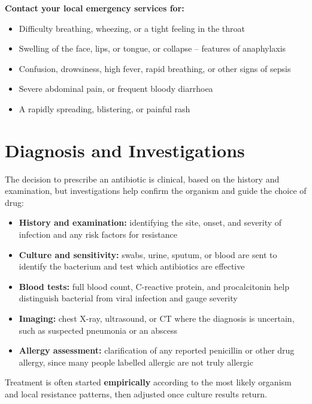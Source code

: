 \textbf{Contact your local emergency services for:}
\begin{itemize}
    \item Difficulty breathing, wheezing, or a tight feeling in the throat
    \item Swelling of the face, lips, or tongue, or collapse -- features of anaphylaxis
    \item Confusion, drowsiness, high fever, rapid breathing, or other signs of sepsis
    \item Severe abdominal pain, or frequent bloody diarrhoea
    \item A rapidly spreading, blistering, or painful rash
\end{itemize}

\section*{Diagnosis and Investigations}
The decision to prescribe an antibiotic is clinical, based on the history and examination, but investigations help confirm the organism and guide the choice of drug:

\begin{itemize}
    \item \textbf{History and examination:} identifying the site, onset, and severity of infection and any risk factors for resistance
    \item \textbf{Culture and sensitivity:} swabs, urine, sputum, or blood are sent to identify the bacterium and test which antibiotics are effective
    \item \textbf{Blood tests:} full blood count, C-reactive protein, and procalcitonin help distinguish bacterial from viral infection and gauge severity
    \item \textbf{Imaging:} chest X-ray, ultrasound, or CT where the diagnosis is uncertain, such as suspected pneumonia or an abscess
    \item \textbf{Allergy assessment:} clarification of any reported penicillin or other drug allergy, since many people labelled allergic are not truly allergic
\end{itemize}

Treatment is often started \textbf{empirically} according to the most likely organism and local resistance patterns, then adjusted once culture results return.

